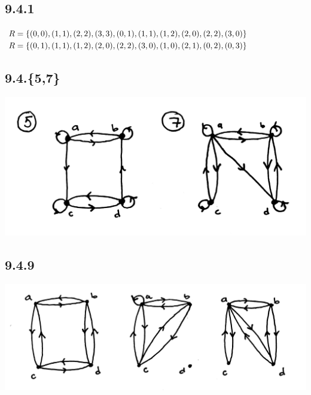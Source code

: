 \documentclass[12pt,titlepage]{extarticle}
\begin{document}
\subsection*{9.4.1}
\begin{tasks}
    \task $R = \qty{(0,0), (1,1), (2,2), (3,3), (0, 1), (1, 1), (1, 2), (2, 0), (2, 2), (3, 0)}$
    \task $R = \qty{(0, 1), (1, 1), (1, 2), (2, 0), (2, 2), (3, 0), (1, 0), (2, 1), (0, 2), (0, 3)}$
\end{tasks}

\subsection*{9.4.\{5,7\}}
\begin{center}
    \includegraphics[width=0.8\linewidth]{figures/reflexive.jpg}
\end{center}

\subsection*{9.4.9}
\begin{center}
    \includegraphics[width=0.8\linewidth]{figures/symmetric.jpg}
\end{center}
\end{document}
